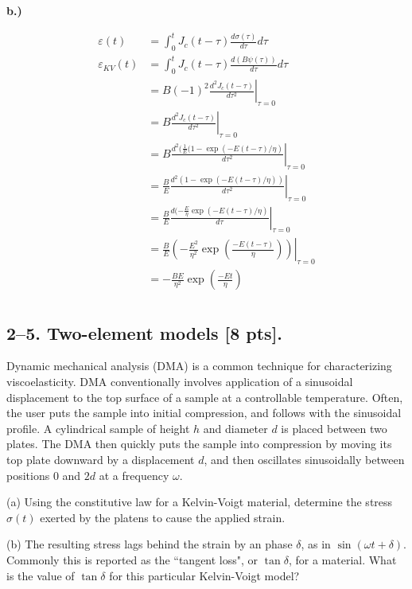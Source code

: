 \textbf{b.)} 

\begin{align*}
    \varepsilon(t) &= \int_0^t J_c(t-\tau)\frac{d\sigma(\tau)}{d\tau}d\tau \\
    \varepsilon_{KV}(t) &=  \int_0^t J_c(t-\tau)\frac{d(B\psi(\tau))}{d\tau}d\tau \\
    &= B (-1)^2\left.\frac{d^2J_c(t-\tau)}{d\tau^2}\right|_{\tau=0} \\
    &= B \left.\frac{d^2J_c(t-\tau)}{d\tau^2}\right|_{\tau=0} \\
    &= B \left.\frac{d^2(\frac{1}{E}(1-\exp(-E(t-\tau)/\eta)}{d\tau^2}\right|_{\tau=0} \\
    &= \frac{B}{E} \left.\frac{d^2(1-\exp(-E(t-\tau)/\eta))}{d\tau^2}\right|_{\tau=0} \\
    &= \left. \frac{B}{E} \frac{d(-\frac{E}{\eta} \exp(-E(t-\tau)/\eta)}{d\tau}\right|_{\tau=0}\\
    &= \left. \frac{B}{E} \left(-\frac{E^2}{\eta^2}\exp\left(\frac{-E(t-\tau)}{\eta}\right)\right) \right|_{\tau=0} \\
    &= -\frac{BE}{\eta^2} \exp\left(\frac{-Et}{\eta}\right) \\
\end{align*}


\bigskip
\subsection*{2--5. \textbf{Two-element models} [8 pts].}

Dynamic mechanical analysis (DMA) is a common technique for characterizing viscoelasticity. 
DMA conventionally involves application of a sinusoidal displacement to the top surface of a sample at a controllable temperature. 
Often, the user puts the sample into initial compression, and follows with the sinusoidal profile. 
A cylindrical sample of height $h$ and diameter $d$ is placed between two plates.
The DMA then quickly puts the sample into compression by moving its top plate downward by a displacement $d$, and then oscillates sinusoidally between positions $0$ and $2d$ at a frequency $\omega$.

\medskip
(a) Using the constitutive law for a Kelvin-Voigt material, determine the stress $\sigma(t)$ exerted by the platens to cause the applied strain. 

\medskip
(b) The resulting stress lags behind the strain by an phase $\delta$, as in $\sin(\omega t + \delta)$. 
Commonly this is reported as the ``tangent loss", or $\tan\delta$, for a material. 
What is the value of $\tan\delta$ for this particular Kelvin-Voigt model?

